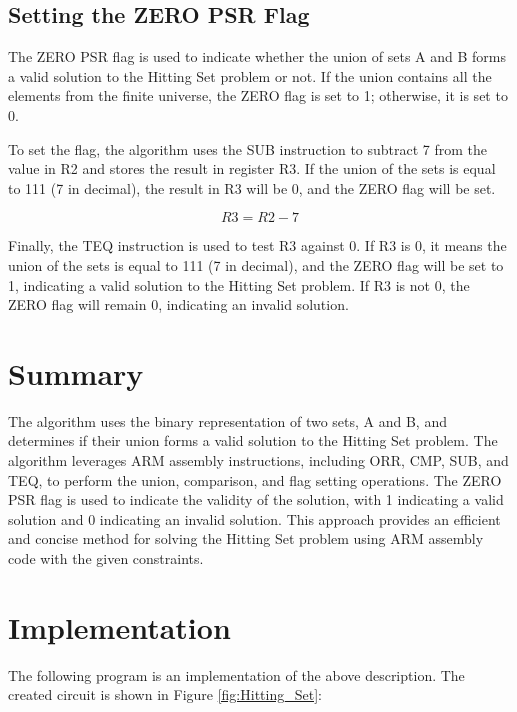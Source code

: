 \subsection{Setting the ZERO PSR Flag}

The ZERO PSR flag is used to indicate whether the union of sets A and B forms a valid solution to the Hitting Set problem or not. If the union contains all the elements from the finite universe, the ZERO flag is set to 1; otherwise, it is set to 0.

To set the flag, the algorithm uses the SUB instruction to subtract 7 from the value in R2 and stores the result in register R3. If the union of the sets is equal to 111 (7 in decimal), the result in R3 will be 0, and the ZERO flag will be set.

\begin{equation}
    R3 = R2 - 7
\end{equation}

Finally, the TEQ instruction is used to test R3 against 0. If R3 is 0, it means the union of the sets is equal to 111 (7 in decimal), and the ZERO flag will be set to 1, indicating a valid solution to the Hitting Set problem. If R3 is not 0, the ZERO flag will remain 0, indicating an invalid solution.

\section{Summary}

The algorithm uses the binary representation of two sets, A and B, and determines if their union forms a valid solution to the Hitting Set problem. The algorithm leverages ARM assembly instructions, including ORR, CMP, SUB, and TEQ, to perform the union, comparison, and flag setting operations. The ZERO PSR flag is used to indicate the validity of the solution, with 1 indicating a valid solution and 0 indicating an invalid solution. This approach provides an efficient and concise method for solving the Hitting Set problem using ARM assembly code with the given constraints.



\section{Implementation}

The following program is an implementation of the above description. The created circuit is shown in Figure \ref{fig:Hitting_Set}:

